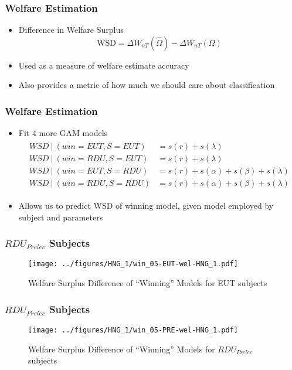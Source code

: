 \documentclass{beamer}
\begin{document}
\begin{frame}
\frametitle{Welfare Estimation}
\begin{itemize}
	\item Difference in Welfare Surplus
	\begin{equation}
		\label{eq4:wsurplusDiff}
		\text{WSD} = \Delta W_{nT}(\hat{\Omega}) - \Delta W_{nT}(\Omega)
	\end{equation}
	\item Used as a measure of welfare estimate accuracy
	\item Also provides a metric of how much we should care about classification
\end{itemize}
\end{frame}

\begin{frame}
\frametitle{Welfare Estimation}
\begin{itemize}
	\item Fit 4 more GAM models
	\begin{align}
		\label{eq4:GAM}
		\begin{split}
			WSD ~|~ (win = EUT , S = EUT) &= s(r) + s(\lambda)\\
			WSD ~|~ (win = RDU , S = EUT) &= s(r) + s(\lambda)\\
			WSD ~|~ (win = EUT , S = RDU) &= s(r) + s(\alpha) + s(\beta) + s(\lambda)\\
			WSD ~|~ (win = RDU , S = RDU) &= s(r) + s(\alpha) + s(\beta) + s(\lambda)
		\end{split}
	\end{align}
	\item Allows us to predict WSD of winning model, given model employed by subject and parameters
\end{itemize}
\end{frame}

\begin{frame}
\frametitle{ $\mathit{RDU_{Prelec}}$ Subjects}
\begin{figure}[hb!]
	\center
	\caption{Welfare Surplus Difference of \enquote{Winning} Models for EUT subjects}
	\texttt{[image: ../figures/HNG\_1/win\_05-EUT-wel-HNG\_1.pdf]}
	\label{fig:HN1_wel_eut}
\end{figure}
\end{frame}

\begin{frame}
\frametitle{ $\mathit{RDU_{Prelec}}$ Subjects}
\begin{figure}[hb!]
	\center
	\caption{Welfare Surplus Difference of \enquote{Winning} Models for $\mathit{RDU_{Prelec}}$ subjects}
	\texttt{[image: ../figures/HNG\_1/win\_05-PRE-wel-HNG\_1.pdf]}
	\label{fig:HN1_wel_eut}
\end{figure}
\end{frame}
\end{document}
